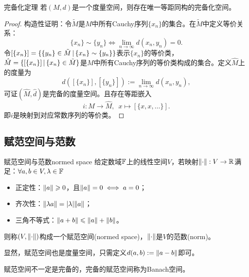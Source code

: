 \begin{theorem}
    {完备化定理}{}
    若$(M,d)$是一个度量空间，则存在唯一等距同构的完备化空间。%
\end{theorem}

\begin{proof}
    构造性证明：令$\tilde M$是$M$中所有Cauchy序列$\{x_n\}$的集合。在$\tilde M$中定义等价关系：
    \begin{equation}\label{eq:na-cauchy-sequence-equivalence}
        \{x_n\} \sim \{y_n\} \iff \lim_{n\to\infty}d(x_n,y_n) = 0.
    \end{equation}
    令$[\{x_n\}] = \{\{y_n\} \in \tilde M\,\vert\,\{x_n\} \sim \{y_n\}\}$表示$\{x_n\}$的等价类，$\hat M = \{[\{x_n\}]\,\vert\,\{x_n\} \in \tilde M\}$是$M$中所有Cauchy序列的等价类构成的集合。定义$\hat M$上的度量为
    \begin{equation}\label{eq:na-completion-metric}
        \hat d([\{x_n\}],[\{y_n\}]) := \lim_{n\to\infty}d(x_n,y_n),
    \end{equation}
    可证$(\hat M,\hat d)$是完备的度量空间。且存在等距嵌入
    \begin{equation}\label{eq:na-completion-embedding}
        i:M \to \hat M,\enspace x \mapsto [\{x,x,\ldots\}].
    \end{equation}
    即$i$是映射到对应常数序列的等价类。
\end{proof}

\subsection{赋范空间与范数}

\begin{definition}
    {赋范空间与范数}{normed space}
    给定数域$\mathbb{F}$上的线性空间$V$，若映射$\lVert\cdot\rVert :V \to \mathbb{R}$满足：$\forall a,b \in V,\lambda \in \mathbb{F}$
    \begin{itemize}
        \item 正定性：$\lVert a\rVert \geqslant 0$，且$\lVert a\rVert = 0 \iff a = 0$；
        \item 齐次性：$\lVert\lambda a\rVert = \lvert\lambda\rvert\lVert a\rVert$；
        \item 三角不等式：$\lVert a + b\rVert \leqslant \lVert a\rVert + \lVert b\rVert$。
    \end{itemize}
    则称$(V,\lVert\cdot\rVert)$构成一个赋范空间(normed space)，$\lVert\cdot\rVert$是$V$的范数(norm)。
\end{definition}

\begin{corollary}
    显然，赋范空间也是度量空间，只需定义$d(a,b) := \lVert a - b\rVert$即可。
\end{corollary}
\begin{remark}
    赋范空间不一定是完备的，完备的赋范空间称为Banach空间。
\end{remark}

